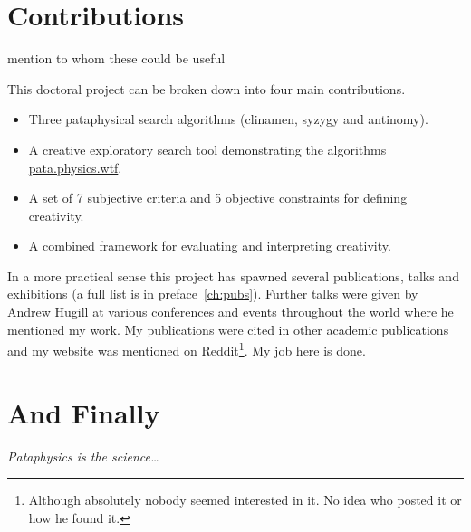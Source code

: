 \section{Contributions}

mention to whom these could be useful


This doctoral project can be broken down into four main contributions.

\begin{itemize}
  \item Three pataphysical search algorithms (clinamen, syzygy and antinomy).
  \item A creative exploratory search tool demonstrating the algorithms \url{pata.physics.wtf}.
  \item A set of 7 subjective criteria and 5 objective constraints for defining creativity.
  \item A combined framework for evaluating and interpreting creativity.
\end{itemize}

In a more practical sense this project has spawned several publications, talks and exhibitions (a full list is in preface~\ref{ch:pubs}). Further talks were given by Andrew Hugill at various conferences and events throughout the world where he mentioned my work. My publications were cited in other academic publications and my website was mentioned on Reddit\footnote{Although absolutely nobody seemed interested in it. No idea who posted it or how he found it.}. My job here is done.


\section{And Finally}

\emph{Pataphysics is the science\ldots}

\stopcontents[chapters]
